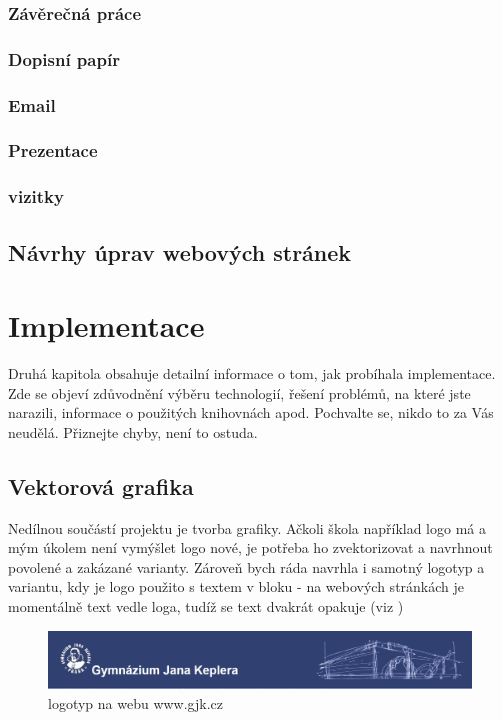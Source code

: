 \documentclass[11pt,a4paper,twoside,openright]{report}
\begin{document}
\subsection{Závěrečná práce}
\subsection{Dopisní papír}
\subsection{Email}
\subsection{Prezentace}
\subsection{vizitky}
\section{Návrhy úprav webových stránek}



\chapter{Implementace}

Druhá kapitola obsahuje detailní informace o tom, jak probíhala implementace. Zde se objeví zdůvodnění výběru technologií, řešení problémů, na které jste narazili, informace o použitých knihovnách apod. Pochvalte se, nikdo to za Vás neudělá. Přiznejte chyby, není to ostuda.

\section{Vektorová grafika}
\label{sec:grafika}
Nedílnou součástí projektu je tvorba grafiky. Ačkoli škola například logo má a mým úkolem není vymýšlet logo nové, je potřeba ho zvektorizovat a navrhnout povolené a zakázané varianty. Zároveň bych ráda navrhla i samotný logotyp a variantu, kdy je logo použito s textem v bloku - na webových stránkách je momentálně text vedle loga, tudíž se text dvakrát opakuje (viz )

\begin{figure}[htbp]
  \includegraphics[width=1\textwidth]{img/gjk_web_hlavicka.png}
  \caption{logotyp na webu www.gjk.cz}
  \label{fig:logotyp_web}
\end{figure}
\end{document}
